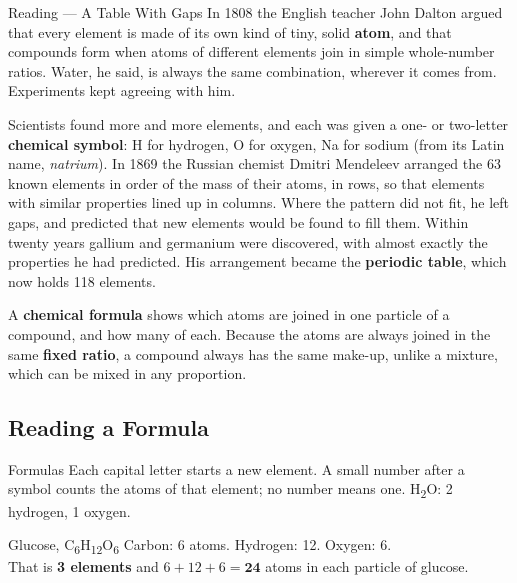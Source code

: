 \begin{readingbox}{Reading --- A Table With Gaps}
In 1808 the English teacher John Dalton argued that every element is made of its own kind of tiny, solid \textbf{atom}, and that compounds form when atoms of different elements join in simple whole-number ratios. Water, he said, is always the same combination, wherever it comes from. Experiments kept agreeing with him.

Scientists found more and more elements, and each was given a one- or two-letter \textbf{chemical symbol}: H for hydrogen, O for oxygen, Na for sodium (from its Latin name, \emph{natrium}). In 1869 the Russian chemist Dmitri Mendeleev arranged the 63 known elements in order of the mass of their atoms, in rows, so that elements with similar properties lined up in columns. Where the pattern did not fit, he left gaps, and predicted that new elements would be found to fill them. Within twenty years gallium and germanium were discovered, with almost exactly the properties he had predicted. His arrangement became the \textbf{periodic table}, which now holds 118 elements.

A \textbf{chemical formula} shows which atoms are joined in one particle of a compound, and how many of each. Because the atoms are always joined in the same \textbf{fixed ratio}, a compound always has the same make-up, unlike a mixture, which can be mixed in any proportion.
\end{readingbox}

\rcreset
{}

\label{theory:1}

\subsection{Reading a Formula}\label{sub:a1.1}

\begin{skillbox}{Formulas}
Each capital letter starts a new element. A small number after a symbol counts the atoms of that element; no number means one. \quad H\textsubscript{2}O: 2 hydrogen, 1 oxygen.
\end{skillbox}

\begin{workedex}{Glucose, C\textsubscript{6}H\textsubscript{12}O\textsubscript{6}}
Carbon: 6 atoms. Hydrogen: 12. Oxygen: 6.\\
That is \textbf{3 elements} and $6 + 12 + 6 = \mathbf{24}$ atoms in each particle of glucose.
\end{workedex}

